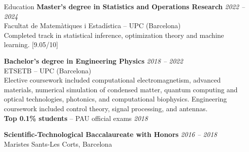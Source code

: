 \documentclass{resume} %
\begin{document}
\begin{rSection}{Education}
{\bf Master's degree in Statistics and Operations Research} \hfill {\em 2022 -- 2024} 
\\ Facultat de Matem\`atiques i Estad\'istica -- UPC (Barcelona) \vspace{0.5em} \\
Completed track in statistical inference, optimization theory and machine learning. [9.05/10]


{\bf Bachelor's degree in Engineering Physics} \hfill {\em 2018 -- 2022} 
\\ ETSETB -- UPC (Barcelona) \vspace{0.5em} \\ 
Elective coursework included computational electromagnetism, advanced materials, 
numerical simulation of condensed matter, quantum computing and optical technologies, photonics, and 
computational biophysics. Engineering coursework included control theory, signal processing, and antennas.\\

{\bf Top 0.1\% students} -- PAU official exams \hfill {\em 2018} 

{\bf Scientific-Technological Baccalaureate with Honors} \hfill {\em 2016 -- 2018} 
\\ Maristes Sants-Les Corts, Barcelona \\
\end{rSection}
\end{document}
